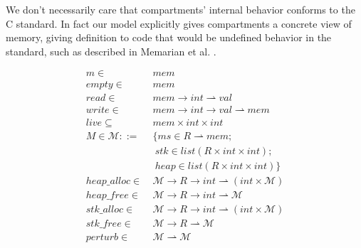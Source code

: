 We don't necessarily care that compartments' internal behavior
conforms to the C standard. In fact our model explicitly gives compartments
a concrete view of memory, giving definition to code that would be undefined behavior
in the standard, such as described in Memarian et al. \cite{Memarian19:ExploringCSemantics}.

\begin{figure}
  \begin{minipage}[t]{0.5\textwidth}
    \vspace{0em}
    \[\begin{split}
    m \in ~ & \mathit{mem} \\
    \mathit{empty} \in ~ & \mathit{mem} \\
    \mathit{read} \in ~ & \mathit{mem} \rightarrow \mathit{int} \rightharpoonup \mathit{val} \\
    \mathit{write} \in ~ & \mathit{mem} \rightarrow \mathit{int} \rightarrow \mathit{val}
    \rightharpoonup \mathit{mem} \\
    \mathit{live} \subseteq ~ & \mathit{mem} \times \mathit{int} \times \mathit{int} \\
    M \in \mathcal{M} ::= ~ & \{
    ms \in R \rightharpoonup \mathit{mem}; \\
    & ~ stk \in list (R \times \mathit{int} \times \mathit{int}); \\
    & ~ heap \in list (R \times \mathit{int} \times \mathit{int})
    \} \\
    \mathit{heap\_alloc} \in ~ & \mathcal{M} \rightarrow R \rightarrow \mathit{int} \rightharpoonup
    (\mathit{int} \times \mathcal{M}) \\
    \mathit{heap\_free} \in ~ & \mathcal{M} \rightarrow R \rightarrow \mathit{int} \rightharpoonup
    \mathcal{M} \\
    \mathit{stk\_alloc} \in ~ & \mathcal{M} \rightarrow R \rightarrow
    \mathit{int} \rightharpoonup (\mathit{int} \times \mathcal{M}) \\
    \mathit{stk\_free} \in ~ & \mathcal{M} \rightarrow R \rightharpoonup
    \mathcal{M} \\
    \mathit{perturb} \in ~ & \mathcal{M} \rightharpoonup \mathcal{M} \\
    \end{split}\]
  \end{minipage}
  \begin{minipage}[t]{0.49\textwidth}
    \vspace{0em}
    \[\begin{aligned}

\end{aligned}\]
\end{minipage}
\end{figure}
